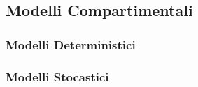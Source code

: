 \subsection{Modelli Compartimentali}

\subsubsection{Modelli Deterministici}

\subsubsection{Modelli Stocastici}